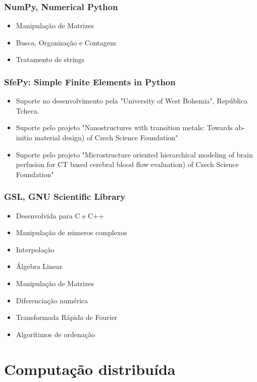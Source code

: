 \documentclass{beamer}
\begin{document}
\begin{frame}
    \frametitle{NumPy, Numerical Python}
    \begin{itemize}
        \item Manipulação de Matrizes
        \item Busca, Organização e Contagem
        \item Tratamento de strings
    \end{itemize}
\end{frame}

\begin{frame}
    \frametitle{SfePy: Simple Finite Elements in Python}

    \begin{itemize}
        \item Suporte no desenvolvimento pela "University of West Bohemia", República Tcheca.
        \item Suporte pelo projeto "Nanostructures with transition metals: Towards ab-initio material design) of Czech Science Foundation"
        \item Suporte pelo projeto "Microstructure oriented hierarchical modeling of brain perfusion for CT based cerebral blood flow evaluation) of Czech Science Foundation"
    \end{itemize}
\end{frame}

\begin{frame}
    \frametitle{GSL, GNU Scientific Library}

    \begin{itemize}
        \item Desenvolvida para C e C++
        \item Manipulação de números complexos
        \item Interpolação
        \item Álgebra Linear
        \item Manipulação de Matrizes
        \item Diferenciação numérica
        \item Transformada Rápida de Fourier
        \item Algorítimos de ordenação
    \end{itemize}
\end{frame}

\section{Computação distribuída}
\end{document}
